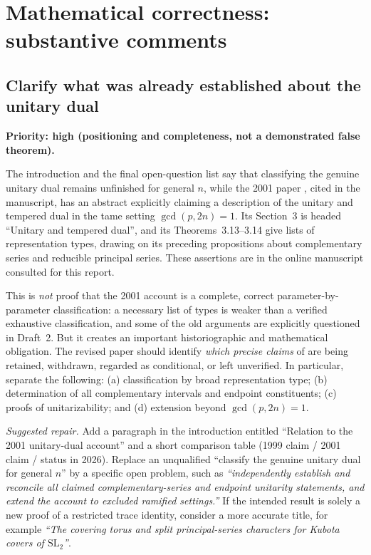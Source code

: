 \documentclass[12pt,letterpaper]{article}
\newcommand{\SL}{\mathrm{SL}}
\begin{document}
\section{Mathematical correctness: substantive comments}

\subsection{Clarify what was already established about the unitary dual}
\label{item:prior}
\textbf{Priority: high (positioning and completeness, not a demonstrated false theorem).}

The introduction and the final open-question list say that classifying the genuine unitary dual remains unfinished for general $n$, while the 2001 paper \cite{Jo01}, cited in the manuscript, has an abstract explicitly claiming a description of the unitary and tempered dual in the tame setting $\gcd(p,2n)=1$. Its Section~3 is headed ``Unitary and tempered dual'', and its Theorems~3.13--3.14 give lists of representation types, drawing on its preceding propositions about complementary series and reducible principal series. These assertions are in the online manuscript consulted for this report.

This is \emph{not} proof that the 2001 account is a complete, correct parameter-by-parameter classification: a necessary list of types is weaker than a verified exhaustive classification, and some of the old arguments are explicitly questioned in Draft~2. But it creates an important historiographic and mathematical obligation. The revised paper should identify \emph{which precise claims} of \cite{Jo01} are being retained, withdrawn, regarded as conditional, or left unverified. In particular, separate the following: (a) classification by broad representation type; (b) determination of all complementary intervals and endpoint constituents; (c) proofs of unitarizability; and (d) extension beyond $\gcd(p,2n)=1$.

\emph{Suggested repair.} Add a paragraph in the introduction entitled ``Relation to the 2001 unitary-dual account'' and a short comparison table (1999 claim / 2001 claim / status in 2026). Replace an unqualified ``classify the genuine unitary dual for general $n$'' by a specific open problem, such as \emph{``independently establish and reconcile all claimed complementary-series and endpoint unitarity statements, and extend the account to excluded ramified settings.''} If the intended result is solely a new proof of a restricted trace identity, consider a more accurate title, for example \emph{``The covering torus and split principal-series characters for Kubota covers of $\SL_2$''}.
\end{document}
